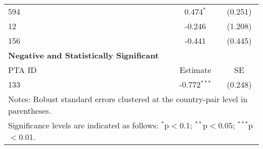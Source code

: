 \begin{table}[htbp]
\begin{adjustbox}{max width=\textwidth}
\begin{tabular}{lcc}
    594 & 0.474$^{\ast}$ & (0.251) \\
    12  & -0.246 & (1.208) \\
    156 & -0.441 & (0.445) \\
    \hline
    \textbf{Negative and Statistically Significant} &  &  \\
    \hline
    PTA ID & Estimate & SE \\
    \hline
    133 & -0.772$^{\ast\ast\ast}$ & (0.248) \\
    \hline
    \multicolumn{3}{l}{\footnotesize{Notes: Robust standard errors clustered at the country-pair level in parentheses.}} \\
    \multicolumn{3}{l}{\footnotesize{Significance levels are indicated as follows: $^{\ast}$p$<$0.1; $^{\ast\ast}$p$<$0.05; $^{\ast\ast\ast}$p$<$0.01.}} \\
    \end{tabular}
    \end{adjustbox} 
\end{table}

